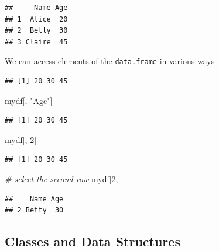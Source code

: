 \documentclass[
  12pt,
]{style/krantz}
\newenvironment{Shaded}{\begin{snugshade}}{\end{snugshade}}
\newcommand{\CommentTok}[1]{\textcolor[rgb]{0.56,0.35,0.01}{\textit{#1}}}
\newcommand{\DecValTok}[1]{\textcolor[rgb]{0.00,0.00,0.81}{#1}}
\newcommand{\NormalTok}[1]{#1}
\newcommand{\SpecialCharTok}[1]{\textcolor[rgb]{0.00,0.00,0.00}{#1}}
\newcommand{\StringTok}[1]{\textcolor[rgb]{0.31,0.60,0.02}{#1}}
\begin{document}
\begin{verbatim}
##     Name Age
## 1  Alice  20
## 2  Betty  30
## 3 Claire  45
\end{verbatim}

We can access elements of the \texttt{data.frame} in various ways

\begin{Shaded}
\end{Shaded}

\begin{verbatim}
## [1] 20 30 45
\end{verbatim}

\begin{Shaded}
\begin{Highlighting}[]
\NormalTok{mydf[, }\StringTok{"Age"}\NormalTok{]}
\end{Highlighting}
\end{Shaded}

\begin{verbatim}
## [1] 20 30 45
\end{verbatim}

\begin{Shaded}
\begin{Highlighting}[]
\NormalTok{mydf[, }\DecValTok{2}\NormalTok{]}
\end{Highlighting}
\end{Shaded}

\begin{verbatim}
## [1] 20 30 45
\end{verbatim}

\begin{Shaded}
\begin{Highlighting}[]
\CommentTok{\# select the second row}
\NormalTok{mydf[}\DecValTok{2}\NormalTok{,]}
\end{Highlighting}
\end{Shaded}

\begin{verbatim}
##    Name Age
## 2 Betty  30
\end{verbatim}

\hypertarget{classes-and-data-structures}{%
\subsection{Classes and Data Structures}\label{classes-and-data-structures}}
\end{document}
